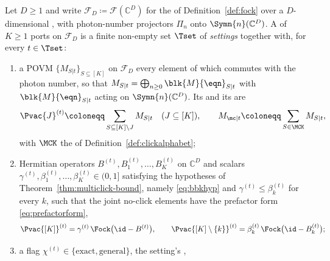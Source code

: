 \begin{definition}\label{def:setting-family}
Let $D\ge1$ and write $\mathcal{F}_D\coloneqq\mathcal{F}(\mathbb{C}^{D})$ for
the  of Definition~\ref{def:fock} over a $D$-dimensional
,
with photon-number projectors $\Pi_n$ onto $\Symn{n}(\mathbb{C}^{D})$. A
of $K\ge1$ ports on $\mathcal{F}_D$ is a finite non-empty set $\Tset$ of
\emph{settings} together with, for every $t\in\Tset$:
\begin{enumerate}[label=(\alph*),leftmargin=2.6em]
\item a POVM $\{M_{S|t}\}_{S\subseteq[K]}$ on $\mathcal{F}_D$ every
  element of which commutes with the photon number, so that
  $M_{S|t}=\bigoplus_{n\ge0}\blk{M}{\eqn}_{S|t}$ with $\blk{M}{\eqn}_{S|t}$
  acting on $\Symn{n}(\mathbb{C}^{D})$. Its
  and its
  are
  \begin{equation}\label{eq:family-elements}
    \Pvac{J}^{(t)}\coloneqq\sum_{S\subseteq[K]\setminus J}M_{S|t}
    \quad(J\subseteq[K]),\qquad
    M_{\mc|t}\coloneqq\sum_{S\in\MCK}M_{S|t},
  \end{equation}
  with $\MCK$ the  of Definition~\ref{def:clickalphabet};
\item Hermitian operators $B^{(t)},B^{(t)}_1,\dots,B^{(t)}_K$ on
  $\mathbb{C}^{D}$ and scalars $\gamma^{(t)},\beta^{(t)}_1,\dots,
  \beta^{(t)}_K\in(0,1]$ satisfying the hypotheses of
  Theorem~\ref{thm:multiclick-bound}, namely \eqref{eq:bbkhyp} and
  $\gamma^{(t)}\le\beta^{(t)}_k$ for every $k$, such that the joint
  no-click elements have the prefactor form \eqref{eq:prefactorform},
  \begin{equation}\label{eq:family-prefactor}
    \Pvac{[K]}^{(t)}=\gamma^{(t)}\,\Fock\big(\id-B^{(t)}\big),\qquad
    \Pvac{[K]\setminus\{k\}}^{(t)}=\beta^{(t)}_k\,\Fock\big(\id-B^{(t)}_k\big);
  \end{equation}
\item a flag $\chi^{(t)}\in\{\mathrm{exact},\mathrm{general}\}$, the
  setting's
  ,

\end{enumerate}
\end{definition}
